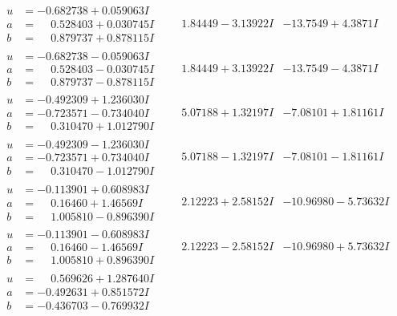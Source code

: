 \documentclass[1p]{elsarticle_modified}
\theoremstyle{definition}
\begin{document}
$$\begin{array}{c|c|c}
\begin{aligned}
u &= -0.682738 + 0.059063 I \\
a &= \phantom{-}0.528403 + 0.030745 I \\
b &= \phantom{-}0.879737 + 0.878115 I\end{aligned}
 & \phantom{-}1.84449 - 3.13922 I & -13.7549 + 4.3871 I \\ \hline\begin{aligned}
u &= -0.682738 - 0.059063 I \\
a &= \phantom{-}0.528403 - 0.030745 I \\
b &= \phantom{-}0.879737 - 0.878115 I\end{aligned}
 & \phantom{-}1.84449 + 3.13922 I & -13.7549 - 4.3871 I \\ \hline\begin{aligned}
u &= -0.492309 + 1.236030 I \\
a &= -0.723571 - 0.734040 I \\
b &= \phantom{-}0.310470 + 1.012790 I\end{aligned}
 & \phantom{-}5.07188 + 1.32197 I & -7.08101 + 1.81161 I \\ \hline\begin{aligned}
u &= -0.492309 - 1.236030 I \\
a &= -0.723571 + 0.734040 I \\
b &= \phantom{-}0.310470 - 1.012790 I\end{aligned}
 & \phantom{-}5.07188 - 1.32197 I & -7.08101 - 1.81161 I \\ \hline\begin{aligned}
u &= -0.113901 + 0.608983 I \\
a &= \phantom{-}0.16460 + 1.46569 I \\
b &= \phantom{-}1.005810 - 0.896390 I\end{aligned}
 & \phantom{-}2.12223 + 2.58152 I & -10.96980 - 5.73632 I \\ \hline\begin{aligned}
u &= -0.113901 - 0.608983 I \\
a &= \phantom{-}0.16460 - 1.46569 I \\
b &= \phantom{-}1.005810 + 0.896390 I\end{aligned}
 & \phantom{-}2.12223 - 2.58152 I & -10.96980 + 5.73632 I \\ \hline\begin{aligned}
u &= \phantom{-}0.569626 + 1.287640 I \\
a &= -0.492631 + 0.851572 I \\
b &= -0.436703 - 0.769932 I\end{aligned}

\end{array}$$
\end{document}
